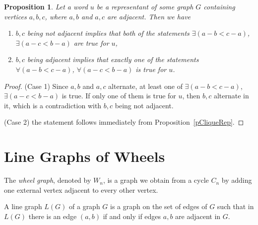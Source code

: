 \documentclass[12pt]{article}
\newtheorem{theorem}{Theorem}
\newtheorem{proposition}[theorem]{Proposition}
\begin{document}
\begin{proposition}\label{pAdAndNotAdVertices} Let a word $u$ be a representant of some graph $G$ containing vertices $a,b,c$, where $a,b$ and $a,c$ are adjacent. Then we have
\begin{enumerate}
  \item $b,c$ being not adjacent implies that both of the statements $\exists (a-b<c-a)$, $\exists (a-c<b-a)$ are true for $u$,
  \item $b,c$ being adjacent implies that exactly one of the statements $\forall (a-b<c-a)$, $\forall (a-c<b-a)$ is true for $u$.
\end{enumerate}
\end{proposition}
\begin{proof} (Case 1) Since $a,b$ and $a,c$ alternate, at least one of $\exists (a-b<c-a)$, $\exists (a-c<b-a)$ is true. If only one of them is true for $u$, then $b,c$ alternate in it, which is a contradiction with $b,c$ being not adjacent.

(Case 2) the statement follows immediately from Proposition~\ref{pCliqueRep}.
\end{proof}




\section{Line Graphs of Wheels}\label{nonReprWheels}

The \emph{wheel graph}, denoted by $W_n$, is a graph we obtain from a cycle $C_n$ by adding one external vertex adjacent to every other vertex.

A line graph $L(G)$ of a graph $G$ is a graph on the set of edges of $G$ such that in $L(G)$  there is an edge $(a,b)$ if and only if edges $a,b$ are adjacent in $G$.
\end{document}
